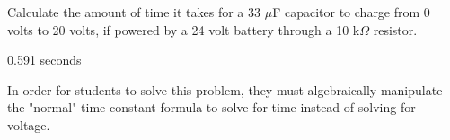 

Calculate the amount of time it takes for a 33 $\mu$F capacitor to charge from 0 volts to 20 volts, if powered by a 24 volt battery through a 10 k$\Omega$ resistor.







0.591 seconds







In order for students to solve this problem, they must algebraically manipulate the "normal" time-constant formula to solve for time instead of solving for voltage.




